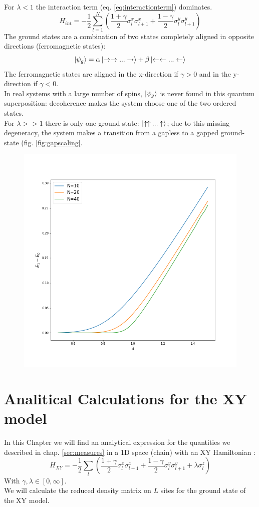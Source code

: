 \documentclass[12pt,a4paper]{book}
\theoremstyle{definition}
\begin{document}
For $\lambda <1$ the interaction term (eq. \ref{eq:interactionterm}) dominates.
\begin{equation}\label{eq:interactionterm}
	H_{int}= -\frac{1}{2} \sum_{l=1}^N \left(\frac{1+\gamma}{2} \sigma_{l}^{x} \sigma_{l+1}^{x}+\frac{1-\gamma}{2} \sigma_{l}^{y} \sigma_{l+1}^{y} \right)
\end{equation}
The ground states are a combination of two states completely aligned in opposite directions (ferromagnetic states):
\begin{equation}
	\ket{\psi_g}=\alpha \ket{\rightarrow \rightarrow...\rightarrow} + \beta \ket{\leftarrow \leftarrow ... \leftarrow}
\end{equation} 
The ferromagnetic states are aligned in the x-direction if $\gamma>0$ and in the y-direction if $\gamma<0$.\\
In real systems with a large number of spins, $\ket{\psi_g}$ is never found in this quantum superposition: decoherence makes the system choose one of the two ordered states.\\
For $\lambda >>1$ there is only one ground state: $\ket{\uparrow \uparrow...\uparrow}$; due to this missing degeneracy, the system makes a transition from a gapless to a gapped ground-state (fig. \ref{fig:gapscaling}.\\
\begin{figure}[h]
	\includegraphics[width=0.7\linewidth]{graphs/energapplot}
	\caption{}
	\label{fig:energapplot}
\end{figure}


\chapter{Analitical Calculations for the XY model}
In this Chapter we will find an analytical expression for the quantities we described in chap. \ref{sec:measures} in a 1D space (chain) with an XY Hamiltonian :
\begin{equation}\label{eq:XYmodel}
	H_{X Y}=-\frac{1}{2} \sum_{l}\left(\frac{1+\gamma}{2} \sigma_{l}^{x} \sigma_{l+1}^{x}+\frac{1-\gamma}{2} \sigma_{l}^{y} \sigma_{l+1}^{y}+\lambda \sigma_{l}^{z}\right)
\end{equation}
With $\gamma, \lambda \in [0,\infty]$.\\
We will calculate the reduced density matrix on $L$ sites for the ground state of the XY model.
\end{document}
